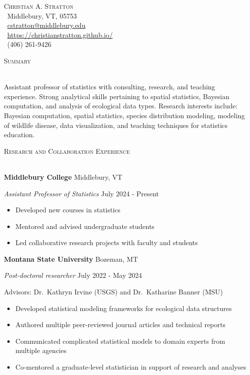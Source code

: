 \documentclass[a4paper]{article}
\newcommand{\lineunder} {
	\vspace*{-8pt} \\
	\hspace*{-18pt} \hrulefill \\
}
\newcommand{\header} [1] {
	{\hspace*{-18pt}\vspace*{6pt} \textcolor{Cerulean}{\textsc{#1}}}
	\vspace*{-6pt} \textcolor{Cerulean}{\lineunder}
}
\begin{document}
\vspace*{-40pt}
\vspace*{-10pt}
\begin{center}
{\Huge \scshape {Christian A. Stratton}} \\
\faMapMarker \ Middlebury, VT, 05753 \\
\faEnvelope \ \href{mailto:cstratton@middlebury.edu}{cstratton@middlebury.edu} \\ 
\faGlobe \ \href{https://christianstratton.github.io/}{https://christianstratton.github.io/} \\
\faPhone \ (406) 261-9426 \\ 
\end{center}
\vspace*{2mm}

\header{Summary}
\vspace*{2mm}

Assistant professor of statistics with consulting, research, and
teaching experience. Strong analytical skills pertaining to spatial
statistics, Bayesian computation, and analysis of ecological data types.
Research interests include: Bayesian computation, spatial statistics,
species distribution modeling, modeling of wildlife disease, data
visualization, and teaching techniques for statistics education.

\vspace*{2mm}
\header{Research and Collaboration Experience}
\vspace*{2mm}

\textbf{Middlebury College} \hfill Middlebury, VT

\textit{Assistant Professor of Statistics} \hfill July 2024 - Present

\vspace{-1mm}
\begin{itemize} \itemsep 1pt
    \item Developed new courses in statistics
    \item Mentored and advised undergraduate students
    \item Led collaborative research projects with faculty and students
\end{itemize}

\textbf{Montana State University} \hfill Bozeman, MT

\textit{Post-doctoral researcher} \hfill July 2022 - May 2024

Advisors: Dr.~Kathryn Irvine (USGS) and Dr.~Katharine Banner (MSU)

\vspace{-1mm}
\begin{itemize} \itemsep 1pt
    \item Developed statistical modeling frameworks for ecological data structures
    \item Authored multiple peer-reviewed journal articles and technical reports
    \item Communicated complicated statistical models to domain experts from multiple agencies
    \item Co-mentored a graduate-level statistician in support of research and analyses
\end{itemize}
\end{document}
